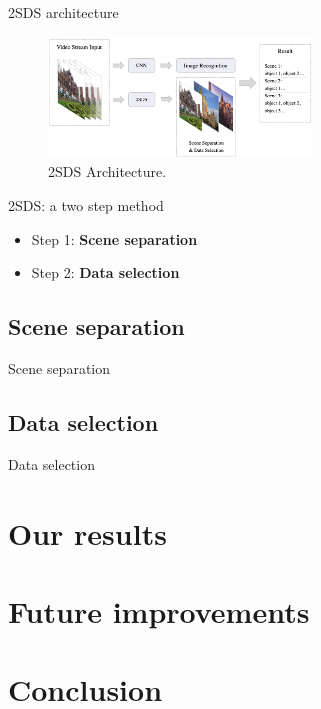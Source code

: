 \documentclass[aspectratio=43,display]{beamer}
\begin{document}
		\begin{frame}{2SDS architecture}

			\begin{figure}
				\includegraphics[width=7cm]{images/2SDS.png}
				\caption{\label{fig:2SDS}2SDS Architecture.}
			\end{figure}

		\end{frame}

		\begin{frame}{2SDS: a two step method}

			\begin{itemize}
				\item Step 1: \textbf{Scene separation}
				\item Step 2: \textbf{Data selection}
			\end{itemize}

		\end{frame}

		\subsection{Scene separation}

			\begin{frame}{Scene separation}
			\end{frame}

		\subsection{Data selection}

			\begin{frame}{Data selection}
			\end{frame}

	\section{Our results}

	\section{Future improvements}

	\section{Conclusion}
\end{document}
